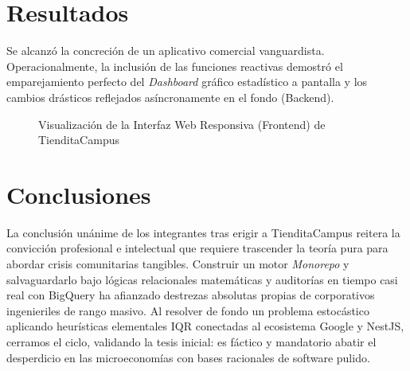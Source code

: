 \documentclass[12pt, a4paper]{article}
\begin{document}
\section{Resultados}
Se alcanzó la concreción de un aplicativo comercial vanguardista. Operacionalmente, la inclusión de las funciones reactivas demostró el emparejamiento perfecto del \textit{Dashboard} gráfico estadístico a pantalla y los cambios drásticos reflejados asíncronamente en el fondo (Backend).

\begin{figure}[H]
    \centering
    \caption{Visualización de la Interfaz Web Responsiva (Frontend) de TienditaCampus}
    \label{fig:resultado_web}
\end{figure}

\section{Conclusiones}
La conclusión unánime de los integrantes tras erigir a TienditaCampus reitera la convicción profesional e intelectual que requiere trascender la teoría pura para abordar crisis comunitarias tangibles. Construir un motor \textit{Monorepo} y salvaguardarlo bajo lógicas relacionales matemáticas y auditorías en tiempo casi real con BigQuery ha afianzado destrezas absolutas propias de corporativos ingenieriles de rango masivo. Al resolver de fondo un problema estocástico aplicando heurísticas elementales IQR conectadas al ecosistema Google y NestJS, cerramos el ciclo, validando la tesis inicial: es fáctico y mandatorio abatir el desperdicio en las microeconomías con bases racionales de software pulido.

\end{document}
